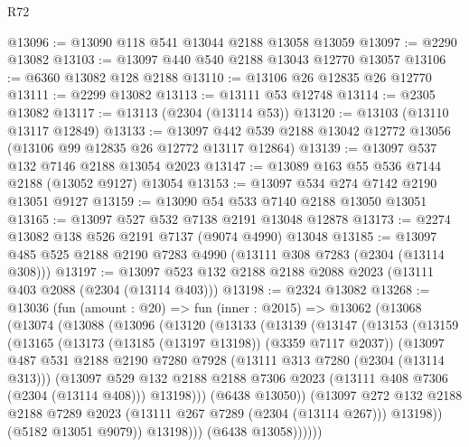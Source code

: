 \begin{lexlean}{R72}
\begin{coremodule}
@13096 := @13090 @118 @541 @13044 @2188 @13058 @13059
@13097 := @2290 @13082
@13103 := @13097 @440 @540 @2188 @13043 @12770 @13057
@13106 := @6360 @13082 @128 @2188
@13110 := @13106 @26 @12835 @26 @12770
@13111 := @2299 @13082
@13113 := @13111 @53 @12748
@13114 := @2305 @13082
@13117 := @13113 (@2304 (@13114 @53))
@13120 := @13103 (@13110 @13117 @12849)
@13133 := @13097 @442 @539 @2188 @13042 @12772 @13056 (@13106 @99 @12835 @26 @12772 @13117 @12864)
@13139 := @13097 @537 @132 @7146 @2188 @13054 @2023
@13147 := @13089 @163 @55 @536 @7144 @2188 (@13052 @9127) @13054
@13153 := @13097 @534 @274 @7142 @2190 @13051 @9127
@13159 := @13090 @54 @533 @7140 @2188 @13050 @13051
@13165 := @13097 @527 @532 @7138 @2191 @13048 @12878
@13173 := @2274 @13082 @138 @526 @2191 @7137 (@9074 @4990) @13048
@13185 := @13097 @485 @525 @2188 @2190 @7283 @4990 (@13111 @308 @7283 (@2304 (@13114 @308)))
@13197 := @13097 @523 @132 @2188 @2188 @2088 @2023 (@13111 @403 @2088 (@2304 (@13114 @403)))
@13198 := @2324 @13082
@13268 := @13036
    (fun (amount : @20) =>
    fun (inner : @2015) =>
    @13062
      (@13068
        (@13074
          (@13088
            (@13096
              (@13120
                (@13133
                  (@13139
                    (@13147
                      (@13153
                        (@13159
                          (@13165
                            (@13173 (@13185 (@13197 @13198)) (@3359 @7117 @2037))
                            (@13097
                              @487
                              @531
                              @2188
                              @2190
                              @7280
                              @7928
                              (@13111 @313 @7280 (@2304 (@13114 @313)))
                              (@13097
                                @529
                                @132
                                @2188
                                @2188
                                @7306
                                @2023
                                (@13111 @408 @7306 (@2304 (@13114 @408)))
                                @13198)))
                          (@6438 @13050))
                        (@13097
                          @272
                          @132
                          @2188
                          @2188
                          @7289
                          @2023
                          (@13111 @267 @7289 (@2304 (@13114 @267)))
                          @13198))
                      (@5182 @13051 @9079))
                    @13198)))
              (@6438 @13058))))))

\end{coremodule}
\end{lexlean}
